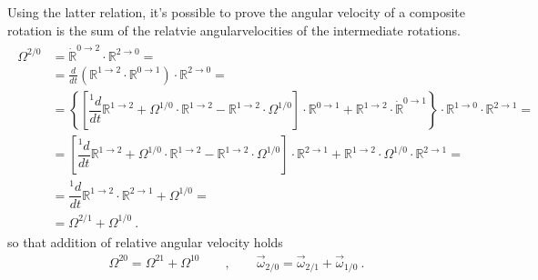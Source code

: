 \documentclass[letterpaper,10pt,english]{jupyterBook}
\begin{document}
\sphinxAtStartPar
Using the latter relation, it’s possible to prove the angular velocity of a composite rotation is the sum of the relatvie angularvelocities of the intermediate rotations.
\begin{equation*}
\begin{split}\begin{aligned}
 \mathbb{\Omega}^{2/0}
 & = \dot{\mathbb{R}}^{0 \rightarrow 2} \cdot \mathbb{R}^{2 \rightarrow 0} = \\
 & = \frac{d}{dt} \left( \mathbb{R}^{1 \rightarrow 2} \cdot \mathbb{R}^{0 \rightarrow 1} \right) \cdot \mathbb{R}^{2 \rightarrow 0} = \\
 & = \left\{ \left[ \dfrac{{}^1 d}{dt} \mathbb{R}^{1 \rightarrow 2} + \mathbb{\Omega}^{1/0} \cdot  \mathbb{R}^{1 \rightarrow 2} - \mathbb{R}^{1 \rightarrow 2} \cdot \mathbb{\Omega}^{1/0} \right] \cdot \mathbb{R}^{0 \rightarrow 1} + \mathbb{R}^{1 \rightarrow 2} \cdot \dot{\mathbb{R}}^{0 \rightarrow 1}  \right\} \cdot \mathbb{R}^{1 \rightarrow 0} \cdot \mathbb{R}^{2 \rightarrow 1} = \\
 & =\left[ \dfrac{{}^1 d}{dt} \mathbb{R}^{1 \rightarrow 2} + \mathbb{\Omega}^{1/0} \cdot  \mathbb{R}^{1 \rightarrow 2} - \mathbb{R}^{1 \rightarrow 2} \cdot \mathbb{\Omega}^{1/0} \right] \cdot \mathbb{R}^{2 \rightarrow 1} + \mathbb{R}^{1 \rightarrow 2} \cdot \mathbb{\Omega}^{1 / 0} \cdot \mathbb{R}^{2 \rightarrow 1} = \\
 & =  \dfrac{{}^1 d}{dt} \mathbb{R}^{1 \rightarrow 2} \cdot \mathbb{R}^{2 \rightarrow 1} + \mathbb{\Omega}^{1/0} = \\
 & = \mathbb{\Omega}^{2/1} + \mathbb{\Omega}^{1/0} \ .
\end{aligned}\end{split}
\end{equation*}
\sphinxAtStartPar
so that addition of relative angular velocity holds
\begin{equation*}
\begin{split}\mathbb{\Omega}^{20} = \mathbb{\Omega}^{21} + \mathbb{\Omega}^{10} \qquad , \qquad \vec{\omega}_{2/0} = \vec{\omega}_{2/1} + \vec{\omega}_{1/0} \ .\end{split}
\end{equation*}\label{ch/kinematics-rotations-tensors:example-0}
\end{document}
